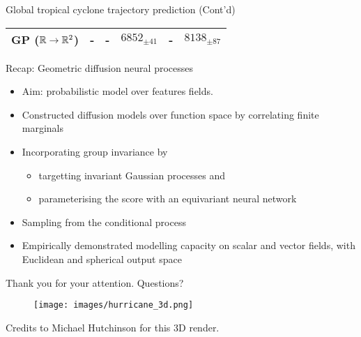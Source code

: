\begin{frame}{Global tropical cyclone trajectory prediction (Cont'd)}
\begin{table}
\begin{tabular}{lrrrrr}
            \textsc{GP ($\mathbb{R}\to\mathbb{R}^2$)} & - & - & $6852_{\pm 41}$ & - & $8138_{\pm 87}$ \\
            \bottomrule
        \end{tabular}
        \label{tab:cyclone_results}
    \end{table}
\end{frame}


\begin{frame}{Recap: Geometric diffusion neural processes}

   \begin{itemize}
      \item Aim: probabilistic model over features fields.
       \item Constructed diffusion models over function space by correlating finite marginals
       \item Incorporating group invariance by 
       \begin{itemize}
       \item targetting invariant Gaussian processes and 
       \item parameterising the score with an equivariant neural network
        \end{itemize}
       \item Sampling from the conditional process
       \item Empirically demonstrated modelling capacity on scalar and vector fields, with Euclidean and spherical output space
   \end{itemize}
   
   \end{frame}

\begin{frame}{Thank you for your attention. Questions?}
\begin{figure}
\centering
\texttt{[image: images/hurricane\_3d.png]}
\end{figure}
\vfill
\vspace{-.5cm}
{\footnotesize Credits to Michael Hutchinson for this 3D render.}
\end{frame}